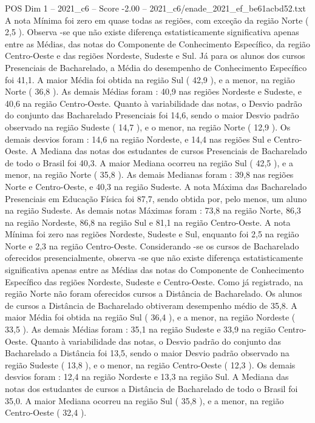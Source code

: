 \begin{textsample}{POS Dim 1 – 2021\_c6 – Score -2.00 – 2021\_c6/enade\_2021\_ef\_be61acbd52.txt}
A nota Mínima foi zero em quase todas as regiões, com exceção da região Norte ( 2,5 ).
Observa -se que não existe diferença estatisticamente significativa apenas entre as Médias, das notas do Componente de Conhecimento Específico, da região Centro-Oeste e das regiões Nordeste, Sudeste e Sul.
Já para os alunos dos cursos Presenciais de Bacharelado, a Média do desempenho de Conhecimento Específico foi 41,1.
A maior Média foi obtida na região Sul ( 42,9 ), e a menor, na região Norte ( 36,8 ).
As demais Médias foram : 40,9 nas regiões Nordeste e Sudeste, e 40,6 na região Centro-Oeste.
Quanto à variabilidade das notas, o Desvio padrão do conjunto das Bacharelado Presenciais foi 14,6, sendo o maior Desvio padrão observado na região Sudeste ( 14,7 ), e o menor, na região Norte ( 12,9 ).
Os demais desvios foram : 14,6 na região Nordeste, e 14,4 nas regiões Sul e Centro-Oeste.
A Mediana das notas dos estudantes de cursos Presenciais de Bacharelado de todo o Brasil foi 40,3.
A maior Mediana ocorreu na região Sul ( 42,5 ), e a menor, na região Norte ( 35,8 ).
As demais Medianas foram : 39,8 nas regiões Norte e Centro-Oeste, e 40,3 na região Sudeste.
A nota Máxima das Bacharelado Presenciais em Educação Física foi 87,7, sendo obtida por, pelo menos, um aluno na região Sudeste.
As demais notas Máximas foram : 73,8 na região Norte, 86,3 na região Nordeste, 86,8 na região Sul e 81,1 na região Centro-Oeste.
A nota Mínima foi zero nas regiões Nordeste, Sudeste e Sul, enquanto foi 2,5 na região Norte e 2,3 na região Centro-Oeste.
Considerando -se os cursos de Bacharelado oferecidos presencialmente, observa -se que não existe diferença estatisticamente significativa apenas entre as Médias das notas do Componente de Conhecimento Específico das regiões Nordeste, Sudeste e Centro-Oeste.
Como já registrado, na região Norte não foram oferecidos cursos a Distância de Bacharelado.
Os alunos de cursos a Distância de Bacharelado obtiveram desempenho médio de 35,8.
A maior Média foi obtida na região Sul ( 36,4 ), e a menor, na região Nordeste ( 33,5 ).
As demais Médias foram : 35,1 na região Sudeste e 33,9 na região Centro-Oeste.
Quanto à variabilidade das notas, o Desvio padrão do conjunto das Bacharelado a Distância foi 13,5, sendo o maior Desvio padrão observado na região Sudeste ( 13,8 ), e o menor, na região Centro-Oeste ( 12,3 ).
Os demais desvios foram : 12,4 na região Nordeste e 13,3 na região Sul.
A Mediana das notas dos estudantes de cursos a Distância de Bacharelado de todo o Brasil foi 35,0.
A maior Mediana ocorreu na região Sul ( 35,8 ), e a menor, na região Centro-Oeste ( 32,4 ).

\end{textsample}

